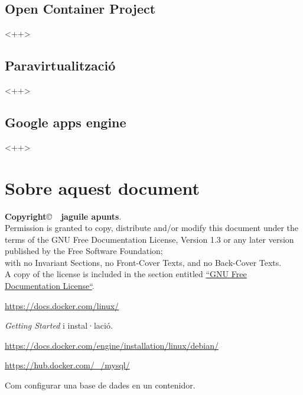 \documentclass[a4paper]{article}
\begin{document}
\subsection{Open Container Project}<++>

\subsection{Paravirtualització}<++>

\subsection{Google apps engine}<++>

\section{Sobre aquest document}
\textbf{Copyright}\copyright\ \textbf{\the\year\ jaguile apunts}.\\
Permission is granted to copy, distribute and/or modify this document under the terms of the GNU Free Documentation License, Version 1.3 or any later version published by the Free Software Foundation;\\
with no Invariant Sections, no Front-Cover Texts, and no Back-Cover Texts.\\
A copy of the license is included in the section entitled \href{http://www.gnu.org/licenses/fdl.html}{``GNU Free Documentation License``}.

\begin{thebibliography}{99}
	 \url{https://docs.docker.com/linux/}

		\textit{Getting Started} i instal·lació.

	 \url{https://docs.docker.com/engine/installation/linux/debian/}

	\url{https://hub.docker.com/_/mysql/}

		Com configurar una base de dades en un contenidor.

\end{thebibliography}
\end{document}
